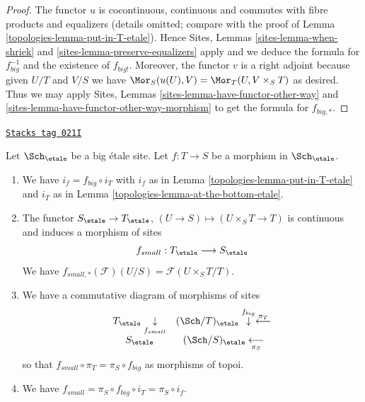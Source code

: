 \begin{proof}

The functor $u$ is cocontinuous, continuous and commutes with fibre products
and equalizers (details omitted; compare with the proof of
Lemma \ref{topologies-lemma-put-in-T-etale}).
Hence
Sites, Lemmas \ref{sites-lemma-when-shriek} and
\ref{sites-lemma-preserve-equalizers}
apply and we deduce the formula
for $f_{big}^{-1}$ and the existence of $f_{big!}$. Moreover,
the functor $v$ is a right adjoint because given $U/T$ and $V/S$
we have $\Mor_S(u(U), V) = \Mor_T(U, V \times_S T)$
as desired. Thus we may apply
Sites, Lemmas \ref{sites-lemma-have-functor-other-way} and
\ref{sites-lemma-have-functor-other-way-morphism} to get the
formula for $f_{big, *}$.
\end{proof}

\begin{lemma}
\label{topologies-lemma-morphism-big-small-etale}
\href{https://stacks.math.columbia.edu/tag/021I}{\texttt{Stacks tag 021I}}

Let $\Sch_\etale$ be a big \'etale site.
Let $f : T \to S$ be a morphism in $\Sch_\etale$.
\begin{enumerate}
\item We have $i_f = f_{big} \circ i_T$ with $i_f$ as in
Lemma \ref{topologies-lemma-put-in-T-etale} and $i_T$ as in
Lemma \ref{topologies-lemma-at-the-bottom-etale}.
\item The functor $S_\etale \to T_\etale$,
$(U \to S) \mapsto (U \times_S T \to T)$ is continuous and induces
a morphism of sites
$$
f_{small} : T_\etale \longrightarrow S_\etale
$$
We have $f_{small, *}(\mathcal{F})(U/S) = \mathcal{F}(U \times_S T/T)$.
\item We have a commutative diagram of morphisms of sites
$$
\begin{array}{cc}T_\etale \underset{f_{small}}{\downarrow} & (\Sch/T)_\etale \overset{f_{big}}{\downarrow}\overset{\pi_T}{\longleftarrow} \\ S_\etale & (\Sch/S)_\etale \underset{\pi_S}{\longleftarrow}\end{array}
$$
so that $f_{small} \circ \pi_T = \pi_S \circ f_{big}$ as morphisms of topoi.
\item We have $f_{small} = \pi_S \circ f_{big} \circ i_T = \pi_S \circ i_f$.
\end{enumerate}
\end{lemma}

